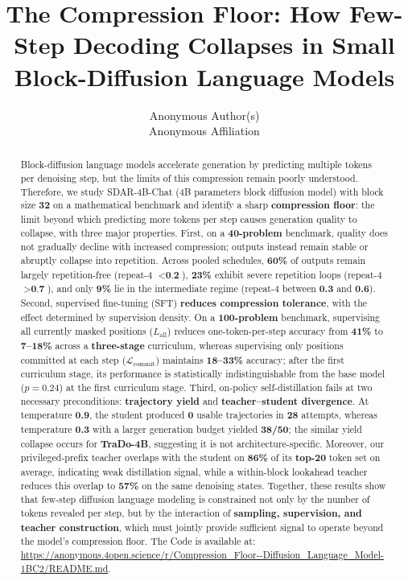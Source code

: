 \documentclass{article}
\title{The Compression Floor: How Few-Step Decoding Collapses in Small Block-Diffusion Language Models}
\author{%
  Anonymous Author(s)\\
  Anonymous Affiliation\\
}
\begin{document}
\maketitle

\begin{abstract}
Block-diffusion language models accelerate generation by predicting multiple tokens per denoising step, but the limits of this compression remain poorly understood. Therefore, we study SDAR-4B-Chat (4B parameters block diffusion model) with block size \textbf{32} on a mathematical benchmark and identify a sharp \textbf{compression floor}: the limit beyond which predicting more tokens per step causes generation quality to collapse, with three major properties. First, on a \textbf{40-problem} benchmark, quality does not gradually decline with increased compression; outputs instead remain stable or abruptly collapse into repetition. Across pooled schedules, \textbf{60\%} of outputs remain largely repetition-free (repeat-4 $< \textbf{0.2}$), \textbf{23\%} exhibit severe repetition loops (repeat-4 $> \textbf{0.7}$), and only \textbf{9\%} lie in the intermediate regime (repeat-4 between \textbf{0.3} and \textbf{0.6}). Second, supervised fine-tuning (SFT) \textbf{reduces compression tolerance}, with the effect determined by supervision density. On a \textbf{100-problem} benchmark, supervising all currently masked positions ($L_{\mathrm{all}}$) reduces one-token-per-step accuracy from \textbf{41\%} to \textbf{7--18\%} across a \textbf{three-stage} curriculum, whereas supervising only positions committed at each step ($\mathcal{L}_{\text{commit}}$) maintains \textbf{18--33\%} accuracy; after the first curriculum stage, its performance is statistically indistinguishable from the base model ($p = 0.24$) at the first curriculum stage. Third, on-policy self-distillation fails at two necessary preconditions: \textbf{trajectory yield} and \textbf{teacher--student divergence}. At temperature \textbf{0.9}, the student produced \textbf{0} usable trajectories in \textbf{28} attempts, whereas temperature \textbf{0.3} with a larger generation budget yielded \textbf{38/50}; the similar yield collapse occurs for \textbf{TraDo-4B}, suggesting it is not architecture-specific. Moreover, our privileged-prefix teacher overlaps with the student on \textbf{86\%} of its \textbf{top-20} token set on average, indicating weak distillation signal, while a within-block lookahead teacher reduces this overlap to \textbf{57\%} on the same denoising states. Together, these results show that few-step diffusion language modeling is constrained not only by the number of tokens revealed per step, but by the interaction of \textbf{sampling, supervision, and teacher construction}, which must jointly provide sufficient signal to operate beyond the model's compression floor. The Code is available at: \url{https://anonymous.4open.science/r/Compression_Floor--Diffusion_Language_Model-1BC2/README.md}.
\end{abstract}
\end{document}
